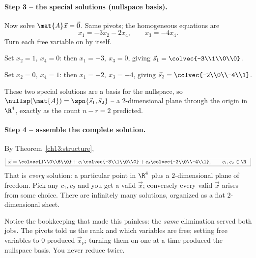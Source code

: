 \paragraph{Step 3 -- the special solutions (nullspace basis).} Now solve
$\mat{A}\vec{x}=\vec{0}$. Same pivots; the homogeneous equations are
\[
  x_1=-3x_2-2x_4,\qquad x_3=-4x_4.
\]
Turn each free variable on by itself.

Set $x_2=1,\ x_4=0$: then $x_1=-3,\ x_3=0$, giving
$\vec{s}_1=\colvec{-3\\1\\0\\0}$.

Set $x_2=0,\ x_4=1$: then $x_1=-2,\ x_3=-4$, giving
$\vec{s}_2=\colvec{-2\\0\\-4\\1}$.

These two special solutions are a basis for the nullspace, so
$\nullsp(\mat{A})=\spn\{\vec{s}_1,\vec{s}_2\}$ -- a $2$-dimensional plane through the
origin in $\R^4$, exactly as the count $n-r=2$ predicted.

\paragraph{Step 4 -- assemble the complete solution.} By
Theorem~\ref{ch13:structure},
\[
  \boxed{\;
  \vec{x}=\colvec{1\\0\\6\\0}
     + c_1\colvec{-3\\1\\0\\0}
     + c_2\colvec{-2\\0\\-4\\1},
  \qquad c_1,c_2\in\R.\;}
\]
That is \emph{every} solution: a particular point in $\R^4$ plus a $2$-dimensional plane of
freedom. Pick any $c_1,c_2$ and you get a valid $\vec{x}$; conversely every valid $\vec{x}$
arises from some choice. There are infinitely many solutions, organized as a flat
$2$-dimensional sheet.

\begin{remark}
Notice the bookkeeping that made this painless: the \emph{same} elimination served both
jobs. The pivots told us the rank and which variables are free; setting free variables to
$0$ produced $\vec{x}_p$; turning them on one at a time produced the nullspace basis. You
never reduce twice.
\end{remark}

